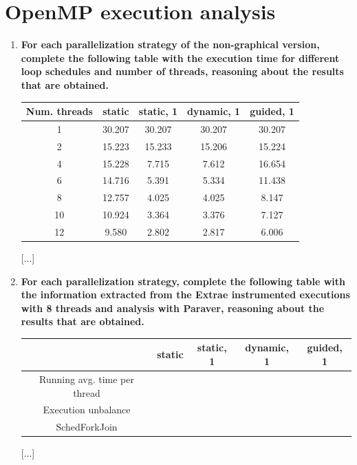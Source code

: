 \documentclass[a4paper,11pt]{article}
\begin{document}
\section{OpenMP execution analysis}
\begin{enumerate}
\setcounter{enumi}{0}
\item
\textbf{For each parallelization strategy of the non-graphical version, complete the following table with
    the execution time for different loop schedules and number of threads, reasoning about the results
    that are obtained.}
\begin{center}
\begin{tabular}{| c || c | c | c | c |}
\hline
\textbf{Num. threads} & \textbf{static} & \textbf{static, 1} & \textbf{dynamic, 1} & \textbf{guided, 1}
\\
\hline
\hline
1 & 30.207 & 30.207 & 30.207 & 30.207
\\
\hline
2 & 15.223 & 15.233 & 15.206 & 15.224
\\
\hline
4 & 15.228 & 7.715 & 7.612 & 16.654
\\
\hline
6 & 14.716 & 5.391 & 5.334 & 11.438
\\
\hline
8 & 12.757 & 4.025 & 4.025 & 8.147
\\
\hline
10 & 10.924 & 3.364 & 3.376 & 7.127
\\
\hline
12 & 9.580 & 2.802 & 2.817 & 6.006
\\
\hline
\end{tabular}
\end{center}
[...]
\setcounter{enumi}{1}
\item
\textbf{For each parallelization strategy, complete the following table with the information extracted from
    the Extrae instrumented executions with 8 threads and analysis with Paraver, reasoning about the
    results that are obtained.}
\begin{center}
\begin{tabular}{| c || c | c | c | c |}
\hline
\textbf{} & \textbf{static} & \textbf{static, 1} & \textbf{dynamic, 1} & \textbf{guided, 1}
\\
\hline
\hline
Running avg. time per thread &  &  &  & 
\\
\hline
Execution unbalance &  &  &  & 
\\
\hline
SchedForkJoin &  &  &  & 
\\
\hline
\end{tabular}
\end{center}
[...]
\end{enumerate}
\end{document}
